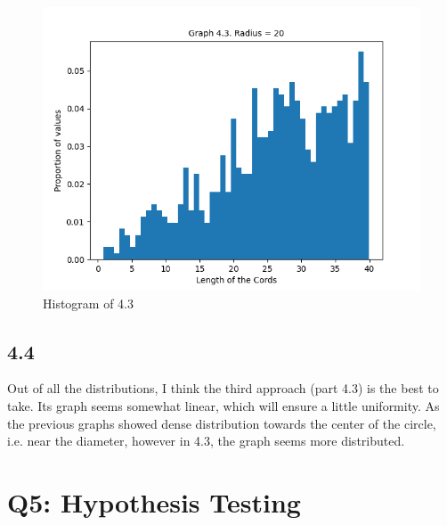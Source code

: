\documentclass[answers]{exam}
\begin{document}
    \begin{figure}[h]
        \caption{Histogram of 4.3}
        \centering
        \includegraphics[scale=0.7]{Q4/Q4(3).png}
    \end{figure}
\newpage
\subsection*{4.4}
    \begin{framed}
        Out of all the distributions, I think the third approach (part 4.3) is the best to take. Its graph seems somewhat linear, which will ensure a little uniformity. As the previous graphs showed dense distribution towards the center of the circle, i.e. near the diameter, however in 4.3, the graph seems more distributed.
    \end{framed}

\pagebreak
\section*{Q5: Hypothesis Testing}
\end{document}
